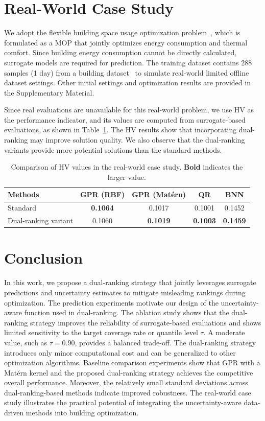 \documentclass{article}
\begin{document}
\section{Real-World Case Study}
We adopt the flexible building space usage optimization problem~\cite{building_opt2}, which is formulated as a MOP that jointly optimizes energy consumption and thermal comfort. Since building energy consumption cannot be directly calculated, surrogate models are required for prediction. The training dataset contains 288 samples (1 day) from a building dataset~\cite{dataset-1} to simulate real-world limited offline dataset settings. Other initial settings and optimization results are provided in the Supplementary Material.

Since real evaluations are unavailable for this real-world problem, we use HV as the performance indicator, and its values are computed from surrogate-based evaluations, as shown in Table~\ref{tab:real_world}. The HV results show that incorporating dual-ranking may improve solution quality. We also observe that the dual-ranking variants provide more potential solutions than the standard methods.

\begin{table}[htbp]
\centering
\caption{Comparison of HV values in the real-world case study. \textbf{Bold} indicates the larger value.}
\label{tab:real_world}
\begin{tabular}{lcccc}
\toprule
Methods & GPR (RBF) & GPR (Mat\'ern) & QR & BNN \\
\midrule
Standard
& \textbf{0.1064} & 0.1017 & 0.1001 & 0.1452 \\
Dual-ranking variant
& 0.1060 & \textbf{0.1019} & \textbf{0.1003} & \textbf{0.1459} \\
\bottomrule
\end{tabular}
\end{table}

\section{Conclusion}
In this work, we propose a dual-ranking strategy that jointly leverages surrogate predictions and uncertainty estimates to mitigate misleading rankings during optimization. The prediction experiments motivate our design of the uncertainty-aware function used in dual-ranking. The ablation study shows that the dual-ranking strategy improves the reliability of surrogate-based evaluations and shows limited sensitivity to the target coverage rate or quantile level $\tau$. A moderate value, such as $\tau=0.90$, provides a balanced trade-off. The dual-ranking strategy introduces only minor computational cost and can be generalized to other optimization algorithms. Baseline comparison experiments show that GPR with a Mat\'ern kernel and the proposed dual-ranking strategy achieves the competitive overall performance. Moreover, the relatively small standard deviations across dual-ranking-based methods indicate improved robustness. The real-world case study illustrates the practical potential of integrating the uncertainty-aware data-driven methods into building optimization.
\end{document}
